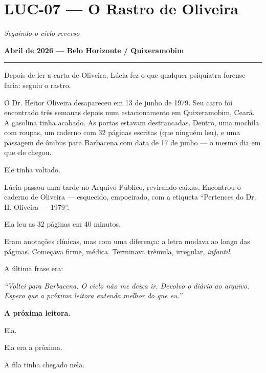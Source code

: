\section*{\textbf{LUC-07} --- O Rastro de Oliveira}

\noindent \textit{Seguindo o ciclo reverso}

\noindent \textbf{Abril de 2026 --- Belo Horizonte / Quixeramobim}

\vspace{0.5em}\noindent\rule{\textwidth}{0.5pt}\vspace{0.5em}

\noindent Depois de ler a carta de Oliveira, Lúcia fez o que qualquer psiquiatra forense faria: seguiu o rastro.

\noindent O Dr. Heitor Oliveira desapareceu em 13 de junho de 1979. Seu carro foi encontrado três semanas depois num estacionamento em Quixeramobim, Ceará. A gasolina tinha acabado. As portas estavam destrancadas. Dentro, uma mochila com roupas, um caderno com 32 páginas escritas (que ninguém leu), e uma passagem de ônibus para Barbacena com data de 17 de junho --- o mesmo dia em que ele chegou.

\noindent Ele tinha voltado.

\noindent Lúcia passou uma tarde no Arquivo Público, revirando caixas. Encontrou o caderno de Oliveira --- esquecido, empoeirado, com a etiqueta \textquotedblleft{}Pertences do Dr. H. Oliveira --- 1979\textquotedblright{}.

\noindent Ela leu as 32 páginas em 40 minutos.

\noindent Eram anotações clínicas, mas com uma diferença: a letra mudava ao longo das páginas. Começava firme, médica. Terminava trêmula, irregular, \textit{infantil}.

\noindent A última frase era:

\noindent \textit{\textquotedblleft{}Voltei para Barbacena. O ciclo não me deixa ir. Devolvo o diário ao arquivo. Espero que a próxima leitora entenda melhor do que eu.\textquotedblright{}}

\noindent \textbf{A próxima leitora.}

\noindent Ela.

\noindent Ela era a próxima.

\noindent A fila tinha chegado nela.

